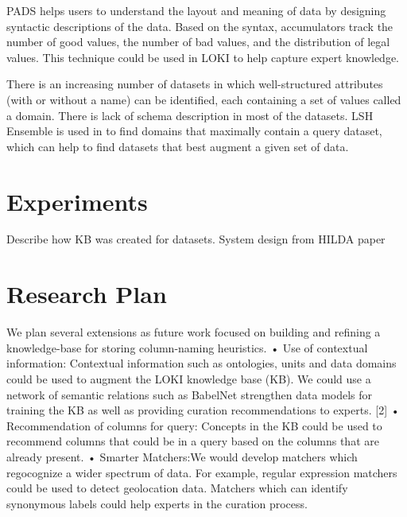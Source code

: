 \documentclass{vldb}
\begin{document}
PADS \cite{fisher2005pads} helps users to understand the layout and meaning of data by designing syntactic descriptions of the data.
Based on the syntax, accumulators track the number of good values, the number of bad values, and the distribution of legal values.
This technique could be used in LOKI to help capture expert knowledge.

There is an increasing number of datasets in which well-structured attributes
(with or without a name) can be identified, each containing a set of values called a domain. There is lack of schema description in most of the datasets.
LSH Ensemble is used in \cite{zhu2016lsh} to find domains that maximally contain a query dataset, which can help to find datasets that best augment a given set of data.

\section{Experiments}
Describe how KB was created for datasets. System design from HILDA paper

\section{Research Plan}
We plan several extensions as future work focused on building and
refining a knowledge-base for storing column-naming heuristics.
• Use of contextual information: Contextual information
such as ontologies, units and data domains could be used to augment
the LOKI knowledge base (KB). We could use a network of
semantic relations such as BabelNet strengthen data models for
training the KB as well as providing curation recommendations
to experts. [2] • Recommendation of columns for query: Concepts
in the KB could be used to recommend columns that could be
in a query based on the columns that are already present. • Smarter
Matchers:We would develop matchers which regocognize a wider
spectrum of data. For example, regular expression matchers could
be used to detect geolocation data. Matchers which can identify
synonymous labels could help experts in the curation process.
\end{document}
